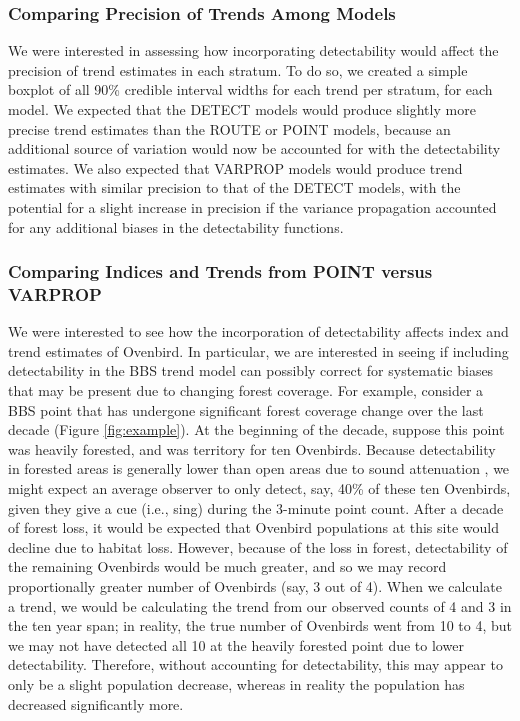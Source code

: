 \subsubsection{Comparing Precision of Trends Among Models}

\par We were interested in assessing how incorporating detectability would affect the precision of trend estimates in each stratum.
To do so, we created a simple boxplot of all 90\% credible interval widths for each trend per stratum, for each model.
We expected that the DETECT models would produce slightly more precise trend estimates than the ROUTE or POINT models, because an additional source of variation would now be accounted for with the detectability estimates.
We also expected that VARPROP models would produce trend estimates with similar precision to that of the DETECT models, with the potential for a slight increase in precision if the variance propagation accounted for any additional biases in the detectability functions.

\subsubsection{Comparing Indices and Trends from POINT versus VARPROP}

\par We were interested to see how the incorporation of detectability affects index and trend estimates of Ovenbird.
In particular, we are interested in seeing if including detectability in the BBS trend model can possibly correct for systematic biases that may be present due to changing forest coverage.
For example, consider a BBS point that has undergone significant forest coverage change over the last decade (Figure \ref{fig:example}).
At the beginning of the decade, suppose this point was heavily forested, and was territory for ten Ovenbirds. 
Because detectability in forested areas is generally lower than open areas due to sound attenuation \citep{yip_sound_2017}, we might expect an average observer to only detect, say, 40\% of these ten Ovenbirds, given they give a cue (i.e., sing) during the 3-minute point count.
After a decade of forest loss, it would be expected that Ovenbird populations at this site would decline due to habitat loss.
However, because of the loss in forest, detectability of the remaining Ovenbirds would be much greater, and so we may record proportionally greater number of Ovenbirds (say, 3 out of 4).
When we calculate a trend, we would be calculating the trend from our observed counts of 4 and 3 in the ten year span; in reality, the true number of Ovenbirds went from 10 to 4, but we may not have detected all 10 at the heavily forested point due to lower detectability.
Therefore, without accounting for detectability, this may appear to only be a slight population decrease, whereas in reality the population has decreased significantly more.

